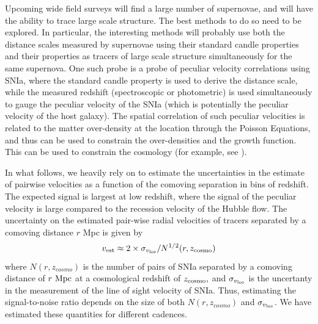 \documentclass[a4paper,10pt]{article}
\begin{document}
Upcoming wide field surveys will find a large number of supernovae, and will have the ability to trace large scale structure. The best methods to do so need to be explored. In particular, the interesting methods will probably use both the distance  scales measured by supernovae using their standard candle properties and their properties as tracers of large scale structure simultaneously for the same supernova. One such probe is a probe of peculiar velocity correlations using SNIa, where the standard candle property is used to derive the distance scale, while the measured redshift (spectroscopic or photometric) is used simultaneously to gauge the peculiar velocity of the SNIa (which is potentially the peculiar velocity of the host galaxy). The spatial correlation of such peculiar velocities is related to the matter over-density at the location through the Poisson Equations, and thus can be used to constrain the over-densities and the growth function. This can be used to constrain the cosmology (for example, see \cite{2011PhRvD..83d3004B}).

In what follows, we heavily rely on \cite{2011PhRvD..83d3004B} to estimate the uncertainties in the estimate of pairwise velocities as a function of the comoving separation in bins of redshift. The expected signal is largest at low redshift, where the signal of the peculiar velocity is large compared to the recession velocity of the Hubble flow.  The uncertainty on the estimated pair-wise radial velocities of tracers separated by a comoving distance $r$ Mpc is given by
\begin{equation}
v_{\rm{est}} \approx 2 \times \sigma_{v_{\rm{los}}} / N^{1/2}(r, z_{\rm{cosmo}})
\end{equation}
where $N(r,z_{cosmo})$ is the number of pairs of SNIa separated by a comoving distance of $r~\rm{Mpc}$
at a cosmological redshift of $z_{\rm{cosmo}},$ and $\sigma_{v_{\rm{los}}}$ is the uncertanty in the
measurement of the line of sight velocity of SNIa. Thus, estimating the signal-to-noise ratio depends on the size of both $N(r, z_{cosmo})$ and $\sigma_{v_{\rm{los}}}$. We have estimated these quantities for different cadences. 
\end{document}

